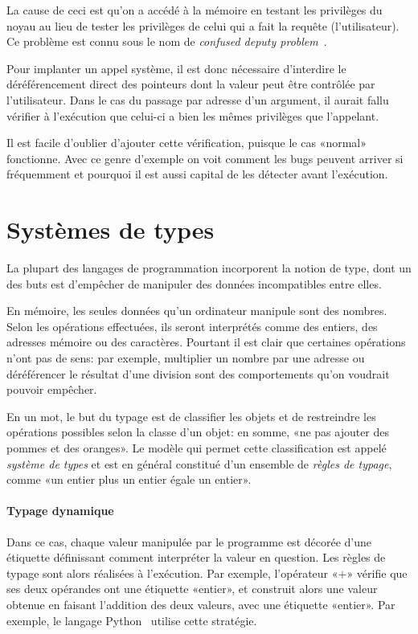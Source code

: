 La cause de ceci est qu'on a accédé à la mémoire en testant les privilèges du
noyau au lieu de tester les privilèges de celui qui a fait la requête
(l'utilisateur). Ce problème est connu sous le nom de \emph{confused deputy
problem}~\cite{hardy88confused}.

Pour implanter un appel système, il est donc nécessaire d'interdire le
déréférencement direct des pointeurs dont la valeur peut être contrôlée par
l'utilisateur. Dans le cas du passage par adresse d'un argument, il aurait fallu
vérifier à l'exécution que celui-ci a bien les mêmes privilèges que l'appelant.

Il est facile d'oublier d'ajouter cette vérification, puisque le cas «normal»
fonctionne. Avec ce genre d'exemple on voit comment les bugs peuvent arriver si
fréquemment et pourquoi il est aussi capital de les détecter avant l'exécution.

\section{Systèmes de types}
\label{sec:types-intro}

La plupart des langages de programmation incorporent la notion de type, dont un
des buts est d'empêcher de manipuler des données incompatibles entre elles.

En mémoire, les seules données qu'un ordinateur manipule sont des nombres. Selon
les opérations effectuées, ils seront interprétés comme des entiers, des
adresses mémoire ou des caractères. Pourtant il est clair que certaines
opérations n'ont pas de sens: par exemple, multiplier un nombre par une adresse
ou déréférencer le résultat d'une division sont des comportements qu'on voudrait
pouvoir empêcher.

En un mot, le but du typage est de classifier les objets et de restreindre les
opérations possibles selon la classe d'un objet: en somme, «ne pas ajouter des
pommes et des oranges». Le modèle qui permet cette classification est appelé
\emph{système de types} et est en général constitué d'un ensemble de
\emph{règles de typage}, comme «un entier plus un entier égale un entier».

\paragraph{Typage dynamique}

Dans ce cas, chaque valeur manipulée par le programme est décorée d'une
étiquette définissant comment interpréter la valeur en question. Les règles de
typage sont alors réalisées à l'exécution. Par exemple, l'opérateur «$+$»
vérifie que ses deux opérandes ont une étiquette «entier», et construit alors
une valeur obtenue en faisant l'addition des deux valeurs, avec une étiquette
«entier». Par exemple, le langage Python~ utilise cette
stratégie.


